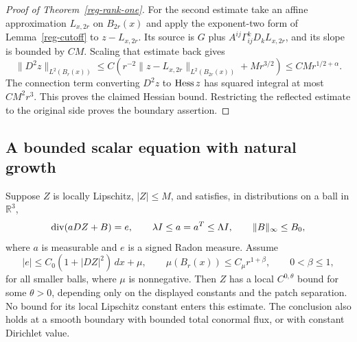 \begin{proof}[Proof of Theorem~\ref{reg-rank-one}]
For the second estimate take an affine approximation $L_{x,2r}$
on $B_{2r}(x)$ and apply the exponent-two form of
Lemma~\ref{reg-cutoff} to $z-L_{x,2r}$. Its source is $G$ plus
$A^{ij}\Gamma_{ij}^kD_kL_{x,2r}$, and its slope is bounded by
$CM$. Scaling that estimate back gives
\[
 \|D^2z\|_{L^2(B_r(x))}
 \le C\left(r^{-2}\|z-L_{x,2r}\|_{L^2(B_{2r}(x))}
                      +Mr^{3/2}\right)
 \le CM r^{1/2+\alpha}.
\]
The connection term converting $D^2z$ to $\operatorname{Hess} z$ has squared
integral at most $CM^2r^3$. This proves the claimed Hessian bound.
Restricting the reflected estimate to the original side proves the
boundary assertion.
\end{proof}

\subsection{A bounded scalar equation with natural growth}

\begin{lemma}
\label{reg-natural-growth}
Suppose $Z$ is locally Lipschitz, $|Z|\le M$, and satisfies, in
distributions on a ball in $\mathbb R^3$,
\begin{equation}
 \operatorname{div}(aDZ+B)=e,
 \qquad \lambda I\le a=a^T\le\Lambda I,
 \qquad \|B\|_\infty\le B_0,
 \label{reg-natural-equation}
\end{equation}
where $a$ is measurable and $e$ is a signed Radon measure. Assume
\begin{equation}
 |e|\le C_0(1+|DZ|^2)\,dx+\mu,
 \qquad
 \mu(B_r(x))\le C_\mu r^{1+\beta},
 \qquad 0<\beta\le1,
 \label{reg-natural-measure}
\end{equation}
for all smaller balls, where $\mu$ is nonnegative. Then $Z$ has
a local $C^{0,\theta}$ bound for some $\theta>0$, depending only
on the displayed constants and the patch separation. No bound for
its local Lipschitz constant enters this estimate. The conclusion
also holds at a smooth boundary with bounded total conormal flux,
or with constant Dirichlet value.
\end{lemma}

